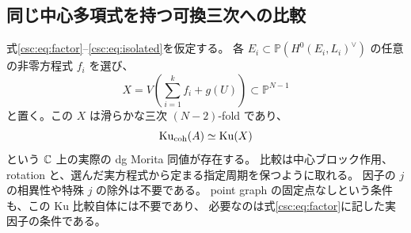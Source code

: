 \subsection{同じ中心多項式を持つ可換三次への比較}

\begin{theorem}[中心変数を持つ分離和の可換実現]
\label{csc:thm:comparison}
式\eqref{csc:eq:factor}--\eqref{csc:eq:isolated}を仮定する。
各 $E_i\subset\mathbb P(H^0(E_i,L_i)^\vee)$ の任意の非零方程式 $f_i$ を選び、
\begin{equation}\label{csc:eq:target}
 X=V\!\left(\sum_{i=1}^kf_i+g(U)\right)\subset\mathbb P^{N-1}
\end{equation}
と置く。この $X$ は滑らかな三次 $(N-2)$-fold であり、
\begin{equation}\label{csc:eq:comparison}
 \operatorname{Ku}_{\mathrm{coh}}(A)\simeq\operatorname{Ku}(X)
\end{equation}
という $\mathbb C$ 上の実際の dg Morita 同値が存在する。
比較は中心ブロック作用、rotation と、選んだ実方程式から定まる指定周期を保つように取れる。
因子の $j$ の相異性や特殊 $j$ の除外は不要である。
point graph の固定点なしという条件も、この Ku 比較自体には不要であり、
必要なのは式\eqref{csc:eq:factor}に記した実因子の条件である。
\end{theorem}
